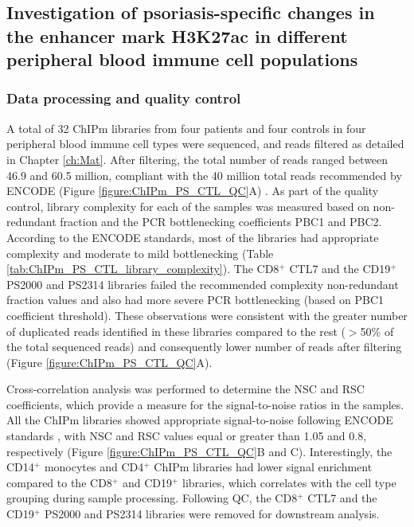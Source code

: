 \subsection{Investigation of psoriasis-specific changes in the enhancer mark H3K27ac in different peripheral blood immune cell populations}

\subsubsection{Data processing and quality control}

A total of 32 ChIPm libraries from four patients and four controls in four peripheral blood immune cell types were sequenced, and reads filtered as detailed in Chapter \ref{ch:Mat}. After filtering, the total number of reads ranged between 46.9 and 60.5 million, compliant with the 40 million total reads recommended by ENCODE (Figure \ref{figure:ChIPm_PS_CTL_QC}A) . As part of the quality control, library complexity for each of the samples was measured based on non-redundant fraction and the PCR bottlenecking coefficients PBC1 and PBC2. According to the ENCODE standards, most of the libraries had appropriate complexity and moderate to mild bottlenecking (Table \ref{tab:ChIPm_PS_CTL_library_complexity}). The CD8$^+$ CTL7 and the CD19$^+$ PS2000 and PS2314 libraries failed the recommended complexity non-redundant fraction values and also had more severe PCR bottlenecking (based on PBC1 coefficient threshold). These observations were consistent with the greater number of duplicated reads identified in these libraries compared to the rest ($>$50\% of the total sequenced reads) and consequently lower number of reads after filtering (Figure \ref{figure:ChIPm_PS_CTL_QC}A).  

Cross-correlation analysis was performed to determine the NSC and RSC coefficients, which provide a measure for the signal-to-noise ratios in the samples. All the ChIPm libraries showed appropriate signal-to-noise following ENCODE standards \parencite{Landt2012}, with NSC and RSC values equal or greater than 1.05 and 0.8, respectively (Figure \ref{figure:ChIPm_PS_CTL_QC}B and C). Interestingly, the CD14$^+$ monocytes and CD4$^+$ ChIPm libraries had lower signal enrichment compared to the CD8$^+$ and CD19$^+$ libraries, which correlates with the cell type grouping during sample processing. Following QC, the CD8$^+$ CTL7 and the CD19$^+$ PS2000 and PS2314 libraries were removed for downstream analysis.



